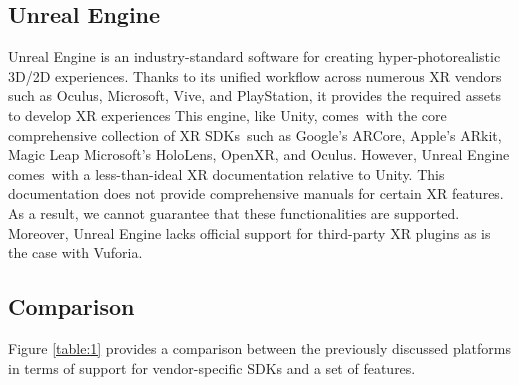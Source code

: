 \documentclass{vgtc}                          %
\begin{document}
\subsection{Unreal Engine}
Unreal Engine is an industry-standard software for creating
hyper-photorealistic 3D/2D experiences. Thanks to its unified workflow across
numerous XR vendors such as Oculus, Microsoft, Vive, and PlayStation, it
provides the required assets to develop XR experiences This engine, like Unity,
comes with the core comprehensive collection of XR SDKs such as Google's
ARCore, Apple's ARkit, Magic Leap Microsoft's HoloLens, OpenXR, and Oculus.
However, Unreal Engine comes with a  less-than-ideal XR documentation relative
to Unity. This documentation does not provide comprehensive manuals for certain
XR features. As a result, we cannot guarantee that these functionalities are
supported. Moreover, Unreal Engine lacks official support for third-party XR
plugins as is the case with Vuforia.
\subsection{Comparison}
Figure \ref{table:1} provides a comparison between the previously discussed
platforms in terms of support for vendor-specific SDKs and a set of features.
\end{document}
